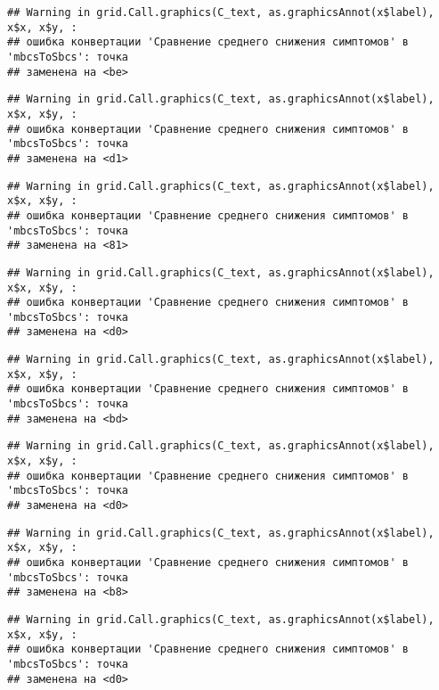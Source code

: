 \documentclass[
]{article}
\begin{document}
\begin{verbatim}
## Warning in grid.Call.graphics(C_text, as.graphicsAnnot(x$label), x$x, x$y, :
## ошибка конвертации 'Сравнение среднего снижения симптомов' в 'mbcsToSbcs': точка
## заменена на <be>
\end{verbatim}

\begin{verbatim}
## Warning in grid.Call.graphics(C_text, as.graphicsAnnot(x$label), x$x, x$y, :
## ошибка конвертации 'Сравнение среднего снижения симптомов' в 'mbcsToSbcs': точка
## заменена на <d1>
\end{verbatim}

\begin{verbatim}
## Warning in grid.Call.graphics(C_text, as.graphicsAnnot(x$label), x$x, x$y, :
## ошибка конвертации 'Сравнение среднего снижения симптомов' в 'mbcsToSbcs': точка
## заменена на <81>
\end{verbatim}

\begin{verbatim}
## Warning in grid.Call.graphics(C_text, as.graphicsAnnot(x$label), x$x, x$y, :
## ошибка конвертации 'Сравнение среднего снижения симптомов' в 'mbcsToSbcs': точка
## заменена на <d0>
\end{verbatim}

\begin{verbatim}
## Warning in grid.Call.graphics(C_text, as.graphicsAnnot(x$label), x$x, x$y, :
## ошибка конвертации 'Сравнение среднего снижения симптомов' в 'mbcsToSbcs': точка
## заменена на <bd>
\end{verbatim}

\begin{verbatim}
## Warning in grid.Call.graphics(C_text, as.graphicsAnnot(x$label), x$x, x$y, :
## ошибка конвертации 'Сравнение среднего снижения симптомов' в 'mbcsToSbcs': точка
## заменена на <d0>
\end{verbatim}

\begin{verbatim}
## Warning in grid.Call.graphics(C_text, as.graphicsAnnot(x$label), x$x, x$y, :
## ошибка конвертации 'Сравнение среднего снижения симптомов' в 'mbcsToSbcs': точка
## заменена на <b8>
\end{verbatim}

\begin{verbatim}
## Warning in grid.Call.graphics(C_text, as.graphicsAnnot(x$label), x$x, x$y, :
## ошибка конвертации 'Сравнение среднего снижения симптомов' в 'mbcsToSbcs': точка
## заменена на <d0>
\end{verbatim}
\end{document}
